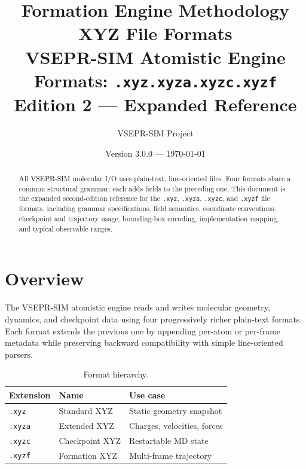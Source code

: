 \documentclass[12pt, a4paper, oneside]{article}
\title{%
  \textbf{Formation Engine Methodology}\\[6pt]
  \textbf{XYZ File Formats}\\[10pt]
  \large VSEPR-SIM Atomistic Engine\\
  Formats: \texttt{.xyz}\quad\texttt{.xyza}\quad\texttt{.xyzc}\quad\texttt{.xyzf}\\[4pt]
  \normalsize Edition 2 --- Expanded Reference
}
\author{VSEPR-SIM Project}
\date{Version 3.0.0 --- \today}
\begin{document}
\maketitle

\begin{abstract}
All VSEPR-SIM molecular I/O uses plain-text, line-oriented files.
Four formats share a common structural grammar; each adds fields to
the preceding one.  This document is the expanded second-edition
reference for the \texttt{.xyz}, \texttt{.xyza}, \texttt{.xyzc}, and
\texttt{.xyzf} file formats, including grammar specifications, field
semantics, coordinate conventions, checkpoint and trajectory usage,
bounding-box encoding, implementation mapping, and typical observable
ranges.
\end{abstract}

\tableofcontents
\newpage

\section{Overview}

The VSEPR-SIM atomistic engine reads and writes molecular geometry,
dynamics, and checkpoint data using four progressively richer
plain-text formats.  Each format extends the previous one by appending
per-atom or per-frame metadata while preserving backward compatibility
with simple line-oriented parsers.

\begin{table}[htbp]
  \centering
  \caption{Format hierarchy.}
  \label{tab:hierarchy}
  \begin{tabular}{llp{8cm}}
    \toprule
    Extension & Name & Use case \\
    \midrule
    \texttt{.xyz}  & Standard XYZ     & Static geometry snapshot \\
    \texttt{.xyza} & Extended XYZ     & Charges, velocities, forces \\
    \texttt{.xyzc} & Checkpoint XYZ   & Restartable MD state \\
    \texttt{.xyzf} & Formation XYZ    & Multi-frame trajectory \\
    \bottomrule
  \end{tabular}
\end{table}
\end{document}
